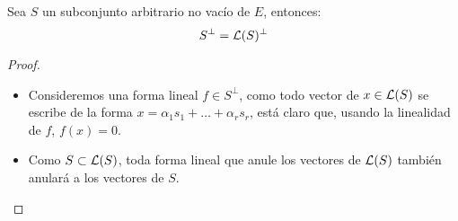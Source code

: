 \begin{lem} Sea $S$ un subconjunto arbitrario no vacío de $E$, entonces:
	\[S^{\perp}=\mathcal{L}(S)^{\perp}\]
\end{lem}\begin{proof}
\begin{itemize}
	\item[\bsubset] Consideremos una forma lineal $f\in S^{\perp}$, como todo vector de $x\in\mathcal{L}(S)$ se escribe de la forma $x=\alpha_1s_1+\dots+\alpha_rs_r$, está claro que, usando la linealidad de $f$, $f(x)=0$.
	\item[\bsetsub] Como $S\subset\mathcal{L}(S)$, toda forma lineal que anule los vectores de $\mathcal{L}(S)$ también anulará a los vectores de $S$.
\end{itemize}
\end{proof}

